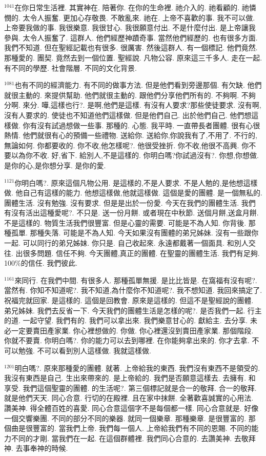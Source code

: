 \documentclass{book}
\begin{document}
$^{1041}$在你日常生活裡.
其實神在.
陪著你.
在你的生命裡.
祂介入的.
祂看顧的.
祂憐憫的.
太令人振奮.
更加心存敬畏.
不敢亂來.
祂在.
上帝不喜歡的事.
我不可以做.
上帝要我做的事.
我很樂意.
我很甘心.
我很願意付出.
不是什麼付出.
是上帝讓我參與.
太令人振奮了.
這群人.
他們經歷神蹟奇事.
當然他們經歷的.
也有很多方面.
我們不知道.
但在聖經記載也有很多.
很厲害.
然後這群人.
有一個標記.
他們竟然.
那種愛的.
團契.
竟然去到一個位置.
聖經說.
凡物公容.
原來這三千多人.
走在一起.
有不同的學歷.
社會階層.
不同的文化背景.

$^{1081}$也有不同的經濟能力.
有不同的做事方法.
但是他們看到旁邊那個.
有欠缺.
他們就很主動的.
來提供幫助.
他們就很主動的.
跟他們分享他們所有的.
不夠啊.
不夠分啊.
來分.
嘩,這樣也行?.
是啊,他們是這樣.
有沒有人要求?那些使徒要求.
沒有啊,沒有人要求的.
使徒也不知道他們這樣做.
但是他們自己.
出於他們自己.
他們想這樣做.
你有沒有試過想做一些事.
那種的.
心態.
我平時.
一直帶長者團體.
很有心很熱情.
他們就很有心的預備一些禮物.
送給你.
送給你,你說我有了,不用了.
不行的,無論如何.
你都要收的.
你不收,他怎樣呢?.
他很受挫折.
你不收,他很不高興.
你不要以為你不收.
好,省下.
給別人,不是這樣的.
你明白嗎?你試過沒有?.
你想,你想做.
是你的心,是你想分享.
是你的愛.

$^{1121}$你明白嗎?.
原來這個凡物公用.
是這樣的,不是人要求.
不是人勉的,是他想這樣做.
他自己有這樣的能力.
他想這樣做,他就這樣做.
這個是愛的團體.
是一個無私的.
團體生活.
沒有勉強.
沒有要求.
但是是出於一份愛.
今天在我們的團體生活.
我們有沒有活出這種愛呢?.
不只是.
送一份月餅.
或者現在中秋節.
送個月餅,送盒月餅.
不是這樣的.
物質生活我們很豐富.
但是心靈的需要.
可能是不為人知.
你背後.
那種孤單.
那種失落.
可能是不為人知.
今天如果沒有團體的弟兄姊妹.
沒有一些跟你一起.
可以同行的弟兄姊妹.
你只是.
自己收起來.
永遠都戴著一個面具.
和別人交往.
出很多問題.
信任不夠.
今天團體,真正的團體.
在聖靈的團體生活.
我們有足夠.
100\%的信任.
我們彼此.

$^{1161}$來同行.
在我們中間.
有很多人.
那種孤單無援.
是比比皆是.
在窩福有沒有呢?.
當然有.
你知不知道呢?.
我不知道,為什麼你不知道呢?.
我不想知道.
我回來搞定了.
祝福完就回家.
是這樣的.
這個是回教會.
原來是這樣的.
但這不是聖經說的團體.
弟兄姊妹.
我們去反省一下.
今天我們的團體生活是怎樣的呢?.
是否我們一起.
行主的道.
一起守望.
我們有的.
我們可以拿出來.
我們樂意甘心的.
獻給主.
去分享.
未必一定要賣田產家業.
你心裡想做的.
你做.
你心裡還沒到賣田產家業.
那個階段.
你就不要賣.
你明白嗎?.
你的能力可以去到哪裡.
在你能夠拿出來的.
你才去拿.
不可以勉強.
不可以看到別人這樣做.
我就這樣做.

$^{1201}$明白嗎?.
原來那種愛的團體.
就著.
上帝給我的東西.
我們沒有東西不是領受的.
我沒有東西是自己.
生出來帶來的.
是上帝給的.
我們是否願意這樣去.
去擁有.
和享受.
我們這個聖靈的團體.
的生活呢?.
第三個標記就是合一的敬拜.
合一的敬拜.
就是他們天天.
同心合意.
行切的在殿裡.
且在家中抹餅.
全著歡喜誠實的心用法.
讚美神.
得全體百姓的喜愛.
同心合意這個字不是每個都一樣.
同心合意就是.
好像一個交響樂團.
不同的部分不同的樂器.
就同一個樂章.
那種樂章.
是很豐富的.
那個曲是很豐富的.
當我們上帝.
我們每一個人.
上帝給我們有不同的恩賜.
不同的能力不同的才剛.
當我們在一起.
在這個群體裡.
我們同心合意的.
去讚美神.
去敬拜神.
去事奉神的時候.
\end{document}
